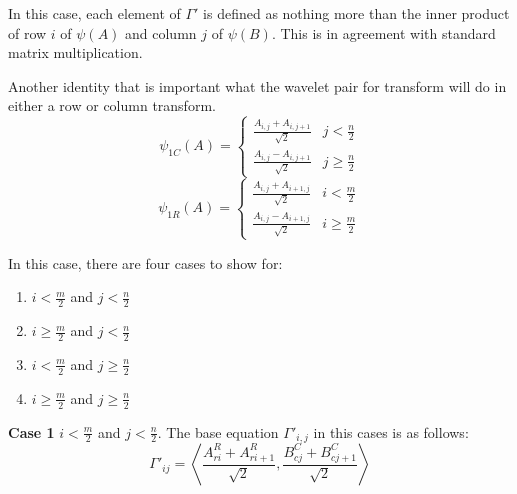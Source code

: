 In this case, each element of $\Gamma'$ is defined as nothing more than the inner product of row $i$ of $\psi(A)$ and column $j$ of $\psi(B)$.  This is in agreement with standard matrix multiplication.  %
%

Another identity that is important what the wavelet pair for transform will do in either a row or column transform.  
\[  \psi _{1C} (A) = \left\{ 
\begin{array}{ll}
\frac{A_{i,j}+A_{i,j+1}}{\sqrt{2}} & j< \frac{n}{2} \\ 
\frac{A_{i,j}-A_{i,j+1}}{\sqrt{2}} & j\geq  \frac{n}{2}%
\end{array}
\right.   \]
 \[  \psi _{1R} (A) = \left\{ 
\begin{array}{ll}
\frac{A_{i,j}+A_{i+1,j}}{\sqrt{2}} & i< \frac{m}{2} \\ 
\frac{A_{i,j}-A_{i+1,j}}{\sqrt{2}} & i\geq  \frac{m}{2}%
\end{array}
\right. 
 \]
 
In this case, there are four cases to show for:
\begin{enumerate}
\item $i < \frac{m}{2}$ and $j <  \frac{n}{2}$
\item $i \geq \frac{m}{2}$ and $j <  \frac{n}{2}$
\item $i < \frac{m}{2}$ and $j \geq  \frac{n}{2}$
\item $i \geq \frac{m}{2}$ and $j \geq  \frac{n}{2}$
\end{enumerate}

 \textbf{Case 1} $i < \frac{m}{2} $ and $j < \frac{n}{2}$.
The base equation $\Gamma'_{i,j}$ in this cases is as follows:
\begin{equation}
\label{case1inner}
 \Gamma'_{ij} = \left\langle \frac {A^R_{ri} + A^R_{ri+1}}{\sqrt{2}} , \frac {B^C_{cj} + B^C_{cj + 1}}{\sqrt{2}} \right\rangle
\end{equation}

